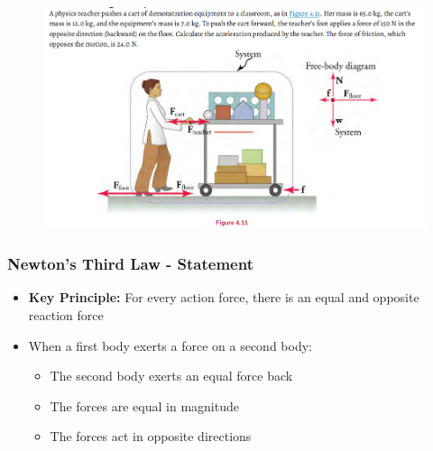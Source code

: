 \documentclass{beamer}
\begin{document}
\begin{frame}
\begin{figure}
    \centering
    \includegraphics[width=1\linewidth]{CH4/Screenshot 2024-11-11 130750.png}
\end{figure}
\end{frame}


\begin{frame}
\frametitle{Newton's Third Law - Statement}
\begin{itemize}
    \item \textbf{Key Principle:} For every action force, there is an equal and opposite reaction force
    \item When a first body exerts a force on a second body:
    \begin{itemize}
        \item The second body exerts an equal force back
        \item The forces are equal in magnitude
        \item The forces act in opposite directions
    \end{itemize}
\end{itemize}
\end{frame}
\end{document}
